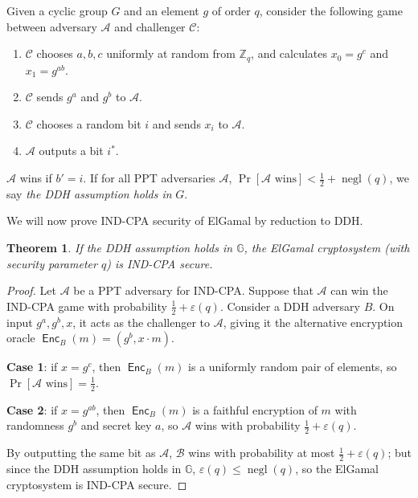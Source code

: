 \documentclass[12pt,a4paper]{article}
\DeclareMathOperator{\negl}{\text{negl}}
\DeclareMathOperator{\Enc}{\mathsf{Enc}}
\newtheorem{theorem}{Theorem}
\theoremstyle{definition}
\begin{document}
\begin{definition}
    Given a cyclic group $G$ and an element $g$ of order $q$, consider the following game between adversary $\mathcal{A}$ and challenger $\mathcal{C}$:
    \begin{enumerate}
        \item $\mathcal{C}$ chooses $a, b, c$ uniformly at random from $\mathbb{Z}_q$, and calculates $x_0=g^c$ and $x_1=g^{ab}$.
        \item $\mathcal{C}$ sends $g^a$ and $g^b$ to $\mathcal{A}$.
        \item $\mathcal{C}$ chooses a random bit $i$ and sends $x_i$ to $\mathcal{A}$.
        \item $\mathcal{A}$ outputs a bit $i^*$.
    \end{enumerate}
    $\mathcal{A}$ wins if $b' = i$. If for all PPT adversaries $\mathcal{A}$, $\Pr[\mathcal{A}\text{ wins}]<\frac{1}{2}+\negl(q)$, we say \textit{the DDH assumption holds in} $G$.
\end{definition}
We will now prove IND-CPA security of ElGamal by reduction to DDH.
\begin{theorem}
    If the DDH assumption holds in $\mathbb{G}$, the ElGamal cryptosystem (with security parameter $q$) is IND-CPA secure.
\end{theorem}
\begin{proof}
    Let $\mathcal{A}$ be a PPT adversary for IND-CPA. Suppose that $\mathcal{A}$ can win the IND-CPA game with probability $\frac{1}{2}+\varepsilon(q)$. Consider a DDH adversary $B$. On input $g^a, g^b, x$, it acts as the challenger to $\mathcal{A}$, giving it the alternative encryption oracle $\Enc_B(m)=(g^b, x\cdot m)$.
    
    \textbf{Case 1}: if $x=g^c$, then $\Enc_B(m)$ is a uniformly random pair of elements, so $\Pr[\mathcal{A}\text{ wins}]=\frac{1}{2}$.
    
    \textbf{Case 2}: if $x=g^{ab}$, then $\Enc_B(m)$ is a faithful encryption of $m$ with randomness $g^b$ and secret key $a$, so $\mathcal{A}$ wins with probability $\frac{1}{2}+\varepsilon(q)$.

    By outputting the same bit as $\mathcal{A}$, $\mathcal{B}$ wins with probability at most $\frac{1}{2}+\varepsilon(q)$; but since the DDH assumption holds in $\mathbb{G}$, $\varepsilon(q)\leq\negl(q)$, so the ElGamal cryptosystem is IND-CPA secure.
\end{proof}
\end{document}
